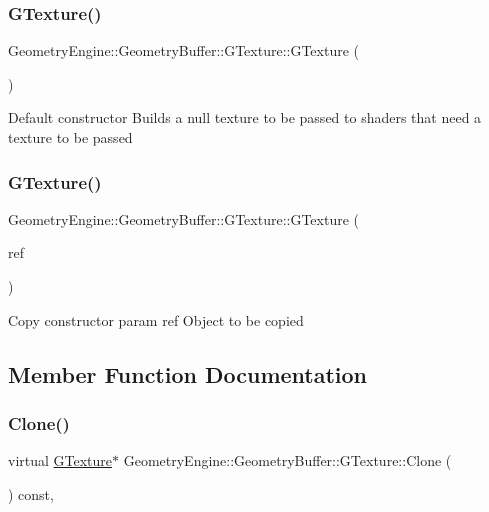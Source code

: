 \subsubsection{\texorpdfstring{GTexture()}{GTexture()}\hspace{0.1cm}{\footnotesize\ttfamily [5/6]}}
{\footnotesize\ttfamily Geometry\+Engine\+::\+Geometry\+Buffer\+::\+G\+Texture\+::\+G\+Texture (\begin{DoxyParamCaption}{ }\end{DoxyParamCaption})}

Default constructor Builds a null texture to be passed to shaders that need a texture to be passed \mbox{\label{class_geometry_engine_1_1_geometry_buffer_1_1_g_texture_a6f0f5cdfdad0a20af7719c743375d678}} 
\subsubsection{\texorpdfstring{GTexture()}{GTexture()}\hspace{0.1cm}{\footnotesize\ttfamily [6/6]}}
{\footnotesize\ttfamily Geometry\+Engine\+::\+Geometry\+Buffer\+::\+G\+Texture\+::\+G\+Texture (\begin{DoxyParamCaption}\item[{const \mbox{\hyperlink{class_geometry_engine_1_1_geometry_buffer_1_1_g_texture}{G\+Texture}} \&}]{ref }\end{DoxyParamCaption})}

Copy constructor param ref Object to be copied 

\subsection{Member Function Documentation}
\mbox{\label{class_geometry_engine_1_1_geometry_buffer_1_1_g_texture_ad8a2b027a88527a03b925448d98efcbf}} 
\subsubsection{\texorpdfstring{Clone()}{Clone()}}
{\footnotesize\ttfamily virtual \mbox{\hyperlink{class_geometry_engine_1_1_geometry_buffer_1_1_g_texture}{G\+Texture}}$\ast$ Geometry\+Engine\+::\+Geometry\+Buffer\+::\+G\+Texture\+::\+Clone (\begin{DoxyParamCaption}{ }\end{DoxyParamCaption}) const\hspace{0.3cm}{\ttfamily [inline]}, {\ttfamily [virtual]}}

